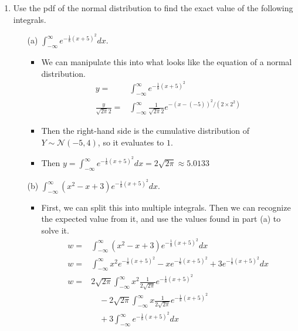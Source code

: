 \documentclass{article}
\begin{document}
\begin{enumerate}
\item Use the pdf of the normal distribution to find the exact value of the following integrals.
    \begin{itemize}
    \item [(a)] $\int_{-\infty}^{\infty}e^{-\frac{1}{8}(x+5)^2}dx$.
        \begin{itemize}
        \item We can manipulate this into what looks like the equation of a normal distribution.
        \begin{equation*}
            \begin{aligned}
            y = & \int_{-\infty}^{\infty}e^{-\frac{1}{8}(x+5)^2} \\
            \frac{y}{\sqrt{2 \pi} 2} = & \int_{-\infty}^{\infty} \frac{1}{\sqrt{2 \pi} 2} e^{-(x - (-5))^2 / (2 \times 2^2)}
            \end{aligned}
        \end{equation*}
        \item Then the right-hand side is the cumulative distribution of $Y \sim \mathcal{N}(-5, 4)$, so it evaluates to $1$.
        \item Then $y = \int_{-\infty}^{\infty}e^{-\frac{1}{8}(x+5)^2}dx = 2 \sqrt{2 \pi} \approx 5.0133 $
        \end{itemize}
    \item [(b)] $\int_{-\infty}^{\infty}(x^2-x+3)e^{-\frac{1}{8}(x+5)^2}dx$.
        \begin{itemize}
        \item First, we can split this into multiple integrals. Then we can recognize the expected value from it, and use the values found in part (a) to solve it.
        \begin{equation*}
            \begin{aligned}
            w = & \int_{-\infty}^{\infty}(x^2-x+3)e^{-\frac{1}{8}(x+5)^2}dx \\
            w = & \int_{-\infty}^{\infty}x^2 e^{-\frac{1}{8}(x+5)^2} - x e^{-\frac{1}{8}(x+5)^2} + 3 e^{-\frac{1}{8}(x+5)^2}dx \\
            w = & 2\sqrt{2 \pi} \int_{-\infty}^{\infty}x^2 \frac{1}{2\sqrt{2 \pi}} e^{-\frac{1}{8}(x+5)^2} \\
                & \quad - 2\sqrt{2 \pi} \int_{-\infty}^{\infty} x \frac{1}{2\sqrt{2 \pi}} e^{-\frac{1}{8}(x+5)^2} \\
                & \quad + 3\int_{-\infty}^{\infty} e^{-\frac{1}{8}(x+5)^2}dx \\

\end{aligned}
\end{equation*}
\end{itemize}
\end{itemize}
\end{enumerate}
\end{document}
